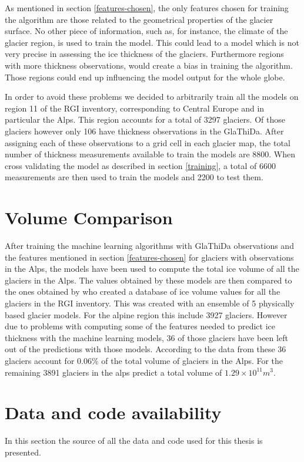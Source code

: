 As mentioned in section \ref{features-chosen}, the only features chosen for training the algorithm are those related to the geometrical properties of the glacier surface. No other piece of information, such as, for instance, the climate of the glacier region, is used to train the model. This could lead to a model which is not very precise in assessing the ice thickness of the glaciers. Furthermore regions with more thickness observations, would create a bias in training the algorithm. Those regions could end up influencing the model output for the whole globe.

In order to avoid these problems we decided to arbitrarily train all the models on region 11 of the RGI inventory, corresponding to Central Europe and in particular the Alps. This region accounts for a total of 3297 glaciers. Of those glaciers however only 106 have thickness observations in the GlaThiDa. After assigning each of these observations to a grid cell in each glacier map, the total number of thickness measurements available to train the models are 8800. When cross validating the model as described in section \ref{training}, a total of 6600 measurements are then used to train the models and 2200 to test them.

\section{Volume Comparison}
After training the machine learning algorithms with GlaThiDa observations and the features mentioned in section \ref{features-chosen} for glaciers with observations in the Alps, the models have been used to compute the total ice volume of all the glaciers in the Alps. The values obtained by these models are then compared to the ones obtained by \citet{Farinotti2019} who created a database of ice volume values for all the glaciers in the RGI inventory. This was created with an ensemble of 5 physically based glacier models. For the alpine region this include 3927 glaciers. However due to problems with computing some of the features needed to predict ice thickness with the machine learning models, 36 of those glaciers have been left out of the predictions with those models. According to the data from \citet{Farinotti2019} these 36 glaciers account for 0.06\% of the total volume of glaciers in the Alps. For the remaining 3891 glaciers in the alps \citet{Farinotti2019} predict a total volume of $1.29\times 10^{11}m^3$.


\section{Data and code availability}
In this section the source of all the data and code used for this thesis is presented.

